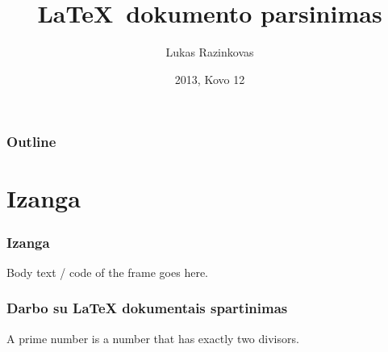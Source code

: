 \documentclass{beamer}
\title[Parsing]{\LaTeX\ dokumento parsinimas}
\author{Lukas Razinkovas}
\date{2013, Kovo 12}
\begin{document}
\begin{frame}
\titlepage
\end{frame}

\begin{frame}
\frametitle{Outline}
\tableofcontents[part=1,pausesections]
\end{frame}

\section{Izanga}

\begin{frame}
\frametitle{Izanga}
Body text / code of the frame goes here.
\end{frame}


\begin{frame}
\frametitle{Darbo su \LaTeX{} dokumentais spartinimas}
A prime number is a number that has exactly two divisors.
\end{frame}
\end{document}
